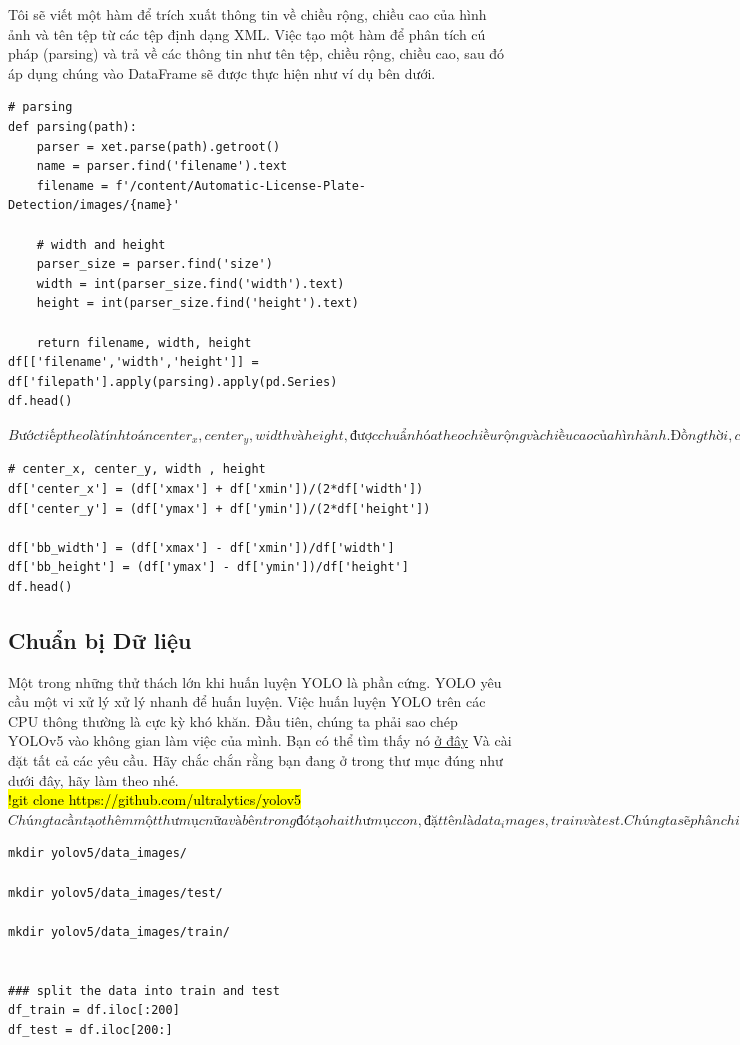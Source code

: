 \documentclass{article}
\begin{document}
Tôi sẽ viết một hàm để trích xuất thông tin về chiều rộng, chiều cao của hình ảnh và tên tệp từ các tệp định dạng XML. Việc tạo một hàm để phân tích cú pháp (parsing) và trả về các thông tin như tên tệp, chiều rộng, chiều cao, sau đó áp dụng chúng vào DataFrame sẽ được thực hiện như ví dụ bên dưới.
\begin{verbatim}
# parsing
def parsing(path):
    parser = xet.parse(path).getroot()
    name = parser.find('filename').text
    filename = f'/content/Automatic-License-Plate-Detection/images/{name}'

    # width and height
    parser_size = parser.find('size')
    width = int(parser_size.find('width').text)
    height = int(parser_size.find('height').text)

    return filename, width, height
df[['filename','width','height']] = df['filepath'].apply(parsing).apply(pd.Series)
df.head()
\end{verbatim}
$
Bước tiếp theo là tính toán center_x, center_y, width và height, được chuẩn hóa theo chiều rộng và chiều cao của hình ảnh. Đồng thời, chuẩn hóa chiều rộng và chiều cao của hộp giới hạn (bounding box).
$
\begin{verbatim}
# center_x, center_y, width , height
df['center_x'] = (df['xmax'] + df['xmin'])/(2*df['width'])
df['center_y'] = (df['ymax'] + df['ymin'])/(2*df['height'])

df['bb_width'] = (df['xmax'] - df['xmin'])/df['width']
df['bb_height'] = (df['ymax'] - df['ymin'])/df['height']
df.head()
\end{verbatim}
\subsection{Chuẩn bị Dữ liệu}

Một trong những thử thách lớn khi huấn luyện YOLO là phần cứng. YOLO yêu cầu một vi xử lý xử lý nhanh để huấn luyện. Việc huấn luyện YOLO trên các CPU thông thường là cực kỳ khó khăn. Đầu tiên, chúng ta phải sao chép YOLOv5 vào không gian làm việc của mình. Bạn có thể tìm thấy nó \href{https://github.com/ultralytics/yolov5}{ở đây}
Và cài đặt tất cả các yêu cầu. Hãy chắc chắn rằng bạn đang ở trong thư mục đúng như dưới đây, hãy làm theo nhé.\\
\textcolor{white}{\hl{!git clone https://github.com/ultralytics/yolov5}}
\\
$
Chúng ta cần tạo thêm một thư mục nữa và bên trong đó tạo hai thư mục con, đặt tên là data_images, train và test. Chúng ta sẽ phân chia dữ liệu thành hai phần: huấn luyện (train) và kiểm tra (test).$
\begin{verbatim}
mkdir yolov5/data_images/

mkdir yolov5/data_images/test/

mkdir yolov5/data_images/train/
    

### split the data into train and test
df_train = df.iloc[:200]
df_test = df.iloc[200:]
\end{verbatim}
\end{document}
